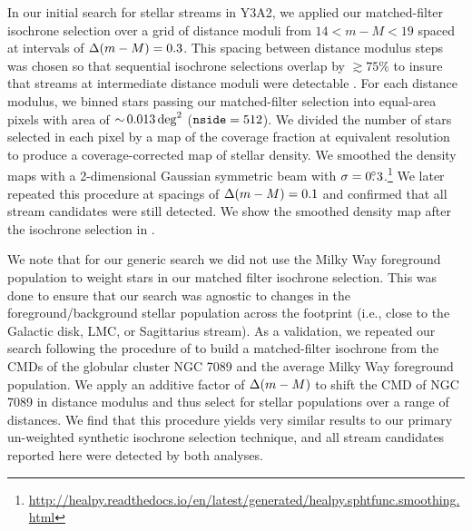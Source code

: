 \documentclass[twocolumn]{aastex61}
\begin{document}
In our initial search for stellar streams in Y3A2, we applied our matched-filter isochrone selection over a grid of distance moduli from $14 < m-M < 19$ spaced at intervals of $\Delta(m - M) = 0.3$. 
This spacing between distance modulus steps was chosen so that sequential isochrone selections overlap by $\gtrsim 75\%$ to insure that streams at intermediate distance moduli were detectable \citep{Grillmair:2017}.
For each distance modulus, we binned stars passing our matched-filter selection  into equal-area \healpix pixels with area of $ {\sim}\, 0.013 \deg^2$ ($\texttt{nside} = 512$).
We divided the number of stars selected in each \healpix pixel by a map of the coverage fraction at equivalent resolution to produce a coverage-corrected map of stellar density.
We smoothed the density maps with a 2-dimensional Gaussian symmetric beam with $\sigma = 0\mbox{$.\!\!^\circ$}3$.\footnote{\url{http://healpy.readthedocs.io/en/latest/generated/healpy.sphtfunc.smoothing.html}}
We later repeated this procedure at spacings of $\Delta(m - M) = 0.1$ and confirmed that all stream candidates were still detected.
We show the smoothed density map after the isochrone selection in .

We note that for our generic search we did not use the Milky Way foreground population to weight stars in our matched filter isochrone selection. 
This was done to ensure that our search was agnostic to changes in the foreground/background stellar population across the footprint (i.e., close to the Galactic disk, LMC, or Sagittarius stream).
As a validation, we repeated our search following the procedure of \citet{Rockosi:2002} to build a matched-filter isochrone from the CMDs of the globular cluster NGC 7089 and the average Milky Way foreground population.
We apply an additive factor of $\Delta(m - M)$ to shift the CMD of NGC 7089 in distance modulus and thus select for stellar populations over a range of distances.
We find that this procedure yields very similar results to our primary un-weighted synthetic isochrone selection technique, and all stream candidates reported here were detected by both analyses.
\end{document}
